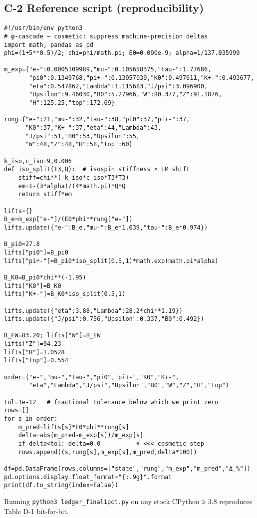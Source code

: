 \documentclass[11pt]{article}
\begin{document}
\subsection*{C-2 Reference script (reproducibility)}
\begingroup
\footnotesize
\begin{verbatim}
#!/usr/bin/env python3
# φ-cascade – cosmetic: suppress machine-precision deltas
import math, pandas as pd
phi=(1+5**0.5)/2; chi=phi/math.pi; E0=0.090e-9; alpha=1/137.035999

m_exp={"e-":0.0005109989,"mu-":0.105658375,"tau-":1.77686,
       "pi0":0.1349768,"pi+-":0.13957039,"K0":0.497611,"K+-":0.493677,
       "eta":0.547862,"Lambda":1.115683,"J/psi":3.096900,
       "Upsilon":9.46030,"B0":5.27966,"W":80.377,"Z":91.1876,
       "H":125.25,"top":172.69}

rung={"e-":21,"mu-":32,"tau-":38,"pi0":37,"pi+-":37,
      "K0":37,"K+-":37,"eta":44,"Lambda":43,
      "J/psi":51,"B0":53,"Upsilon":55,
      "W":48,"Z":48,"H":58,"top":60}

k_iso,c_iso=9,0.006
def iso_split(T3,Q):  # isospin stiffness × EM shift
    stiff=chi**(-k_iso*c_iso*T3*T3)
    em=1-(3*alpha)/(4*math.pi)*Q*Q
    return stiff*em

lifts={}
B_e=m_exp["e-"]/(E0*phi**rung["e-"])
lifts.update({"e-":B_e,"mu-":B_e*1.039,"tau-":B_e*0.974})

B_pi0=27.8
lifts["pi0"]=B_pi0
lifts["pi+-"]=B_pi0*iso_split(0.5,1)*math.exp(math.pi*alpha)

B_K0=B_pi0*chi**(-1.95)
lifts["K0"]=B_K0
lifts["K+-"]=B_K0*iso_split(0.5,1)

lifts.update({"eta":3.88,"Lambda":28.2*chi**1.19})
lifts.update({"J/psi":0.756,"Upsilon":0.337,"B0":0.492})

B_EW=83.20; lifts["W"]=B_EW
lifts["Z"]=94.23
lifts["H"]=1.0528
lifts["top"]=0.554

order=("e-","mu-","tau-","pi0","pi+-","K0","K+-",
       "eta","Lambda","J/psi","Upsilon","B0","W","Z","H","top")

tol=1e-12   # fractional tolerance below which we print zero
rows=[]
for s in order:
    m_pred=lifts[s]*E0*phi**rung[s]
    delta=abs(m_pred-m_exp[s])/m_exp[s]
    if delta<tol: delta=0.0          # <<< cosmetic step
    rows.append((s,rung[s],m_exp[s],m_pred,delta*100))

df=pd.DataFrame(rows,columns=["state","rung","m_exp","m_pred","Δ_%"])
pd.options.display.float_format="{:.9g}".format
print(df.to_string(index=False))

\end{verbatim}
\endgroup
\noindent
Running \texttt{python3 ledger\_final1pct.py} on any stock CPython ≥ 3.8
reproduces Table D-1 bit-for-bit.
\end{document}
